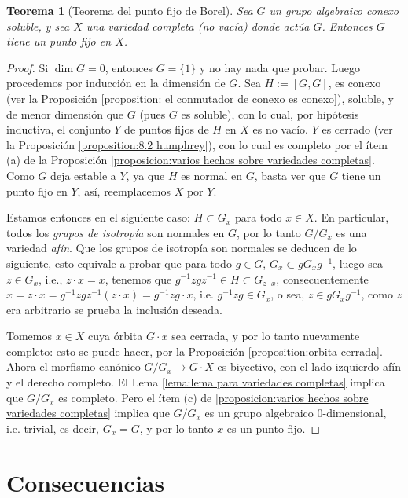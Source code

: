 \documentclass[spanish,10pt]{amsart}
\newtheorem{theorem}{Teorema}[section]
\theoremstyle{definition}
\theoremstyle{remark}
\numberwithin{equation}{section}
\begin{document}
\begin{theorem}[Teorema del punto fijo de Borel]\label{teorema:punto fijo de borel}
Sea $G$ un grupo algebraico conexo soluble, y sea $X$ una variedad completa (no vacía) donde actúa $G$. Entonces $G$ tiene un punto fijo en $X$.
\end{theorem}
\begin{proof}
Si $\dim G = 0$, entonces $G = \{1\}$ y no hay nada que probar. Luego procedemos por inducción en la dimensión de $G$. Sea $H := [G, G]$, es conexo (ver la Proposición \ref{proposition: el conmutador de conexo es conexo}), soluble, y de menor dimensión que $G$ (pues $G$ es soluble), con lo cual, por hipótesis inductiva, el conjunto $Y$ de puntos fijos de $H$ en $X$ es no vacío. $Y$ es cerrado (ver la Proposición \ref{proposition:8.2 humphrey}), con lo cual es completo por el ítem (a) de la Proposición \ref{proposicion:varios hechos sobre variedades completas}. Como $G$ deja estable a $Y$, ya que $H$ es normal en $G$, basta ver que $G$ tiene un punto fijo en $Y$, así, reemplacemos $X$ por $Y$.

Estamos entonces en el siguiente caso: $H \subset G_x$ para todo $x \in X$. En particular, todos los \textit{grupos de isotropía} son normales en $G$, por lo tanto $G/G_x$ es una variedad \textit{afín}. Que los grupos de isotropía son normales se deducen de lo siguiente, esto equivale a probar que para todo $g \in G$, $G_x \subset g G_x g^{-1}$, luego sea $z \in G_x$, i.e., $z \cdot x = x$, tenemos que $g^{-1}z g z^{-1} \in H \subset G_{z \cdot x}$, consecuentemente $x = z \cdot x = g^{-1} z g z^{-1} (z \cdot x) = g^{-1} z g \cdot x$, i.e. $g ^{-1} z g \in G_x$, o sea, $z \in g G_x g^{-1}$, como $z$ era arbitrario se prueba la inclusión deseada.

Tomemos $x \in X$ cuya órbita $G \cdot x$ sea cerrada, y por lo tanto nuevamente completo: esto se puede hacer, por la Proposición \ref{proposition:orbita cerrada}. Ahora el morfismo canónico $G / G_x \to G \cdot X$ es biyectivo, con el lado izquierdo afín y el derecho completo. El Lema \ref{lema:lema para variedades completas} implica que $G/G_x$ es completo. Pero el ítem (c) de \ref{proposicion:varios hechos sobre variedades completas} implica que $G/G_x$ es un grupo algebraico $0$-dimensional, i.e. trivial, es decir, $G_x = G$, y por lo tanto $x$ es un punto fijo.
\end{proof}

\section{Consecuencias}
\end{document}
